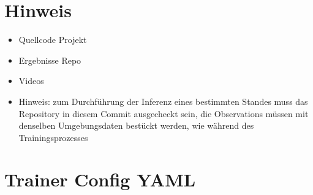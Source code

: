 \chapter{Hinweis}
\begin{itemize}
    \item Quellcode Projekt
    \item Ergebnisse Repo
    \item Videos
    \item Hinweis: zum Durchführung der Inferenz eines bestimmten Standes muss das Repository in diesem Commit ausgecheckt sein, die Observations müssen mit denselben Umgebungsdaten bestückt werden, wie während des Trainingsprozesses
\end{itemize}


\chapter{Trainer Config YAML}
\label{anhang:trainer-config}
\begin{figure}[H]
    
\end{figure}